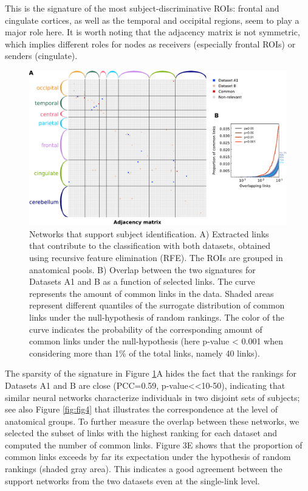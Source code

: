 \documentclass[12pt, a4paper, final, fleqn]{article}
\begin{document}
This is the signature of the
most subject-discriminative ROIs: frontal and cingulate cortices, as well as
the temporal and occipital regions, seem to play a major role here. It is worth
noting that the adjacency matrix is not symmetric, which implies different
roles for nodes as receivers (especially frontal ROIs) or senders (cingulate).

\begin{figure}[htpb]
	\centering
	\includegraphics[width=0.9\columnwidth]{fig3}
	\caption{Networks that support subject identification. A) Extracted
links that contribute to the classification with both datasets, obtained using
recursive feature elimination (RFE). The ROIs are grouped in anatomical pools.
B) Overlap between the two signatures
for Datasets A1 and B as a function of selected links. The curve represents the
amount of common links in the data. Shaded areas represent different quantiles
of the surrogate distribution of common links under the null-hypothesis of
random rankings. The color of the curve indicates the probability of the
corresponding amount of common links under the null-hypothesis (here p-value <
0.001 when considering more than 1\% of the total links, namely 40 links).}
	\label{fig:fig3}
\end{figure}

The sparsity of the signature in Figure \ref{fig:fig3}A hides the fact that the rankings for
Datasets A1 and B are close (PCC=0.59, p-value<<10-50), indicating that similar
neural networks characterize individuals in two disjoint sets of subjects; see
also Figure \ref{fig:fig4} that illustrates the correspondence at the level of anatomical
groups. To further measure the overlap between these
networks, we selected the subset of links with the highest ranking for each
dataset and computed the number of common links. Figure 3E shows that the
proportion of common links exceeds by far its expectation under the hypothesis
of random rankings (shaded gray area). This indicates a good agreement between
the support networks from the two datasets even at the single-link level.
\end{document}
